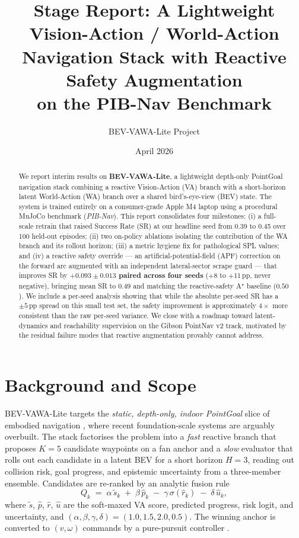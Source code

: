 \documentclass[11pt,a4paper]{article}
\title{\textbf{Stage Report: A Lightweight Vision-Action / World-Action\\
Navigation Stack with Reactive Safety Augmentation\\
on the PIB-Nav Benchmark}}
\author{BEV-VAWA-Lite Project}
\date{April 2026}
\begin{document}
\maketitle

\begin{abstract}
We report interim results on \textbf{BEV-VAWA-Lite}, a lightweight
depth-only PointGoal navigation stack combining a reactive Vision-Action
(VA) branch with a short-horizon latent World-Action (WA) branch over a
shared bird's-eye-view (BEV) state. The system is trained entirely on a
consumer-grade Apple M4 laptop using a procedural MuJoCo benchmark
(\emph{PIB-Nav}). This report consolidates four milestones: (i) a
full-scale retrain that raised Success Rate (SR) at our headline seed
from 0.39 to 0.45 over 100 held-out episodes; (ii) two on-policy
ablations isolating the contribution of the WA branch and its rollout
horizon; (iii) a metric hygiene fix for pathological SPL values; and
(iv) a reactive safety override --- an artificial-potential-field (APF)
correction on the forward arc augmented with an independent
lateral-sector scrape guard --- that improves SR by
\textbf{$+0.093 \pm 0.013$ paired across four seeds}
($+8$ to $+11$\,pp, never negative), bringing mean SR to $0.49$ and
matching the reactive-safety A$^\star$ baseline ($0.50$). We include a
per-seed analysis showing that while the absolute per-seed SR has
a $\pm 5$\,pp spread on this small test set, the safety improvement is
approximately $4\times$ more consistent than the raw per-seed variance.
We close with a roadmap toward latent-dynamics and reachability
supervision on the Gibson PointNav v2 track, motivated by the residual
failure modes that reactive augmentation provably cannot address.
\end{abstract}

\section{Background and Scope}\label{sec:bg}

BEV-VAWA-Lite targets the \emph{static, depth-only, indoor PointGoal}
slice of embodied navigation \citep{AndersonOnEvaluation2018}, where
recent foundation-scale systems
\citep{OmniVLA,NaVILA,InternNav} are arguably overbuilt. The stack
factorises the problem into a \emph{fast} reactive branch that proposes
$K{=}5$ candidate waypoints on a fan anchor and a \emph{slow} evaluator
that rolls out each candidate in a latent BEV for a short horizon
$H{=}3$, reading out collision risk, goal progress, and epistemic
uncertainty from a three-member ensemble. Candidates are re-ranked by
an analytic fusion rule
\begin{equation}
Q_k \;=\; \alpha\,\tilde{s}_k \;+\; \beta\,\hat{p}_k
        \;-\; \gamma\,\sigma(\hat{r}_k) \;-\; \delta\,\hat{u}_k,
\label{eq:fusion}
\end{equation}
where $\tilde{s}$, $\hat{p}$, $\hat{r}$, $\hat{u}$ are the
soft-maxed VA score, predicted progress, risk logit, and uncertainty,
and $(\alpha,\beta,\gamma,\delta)=(1.0,1.5,2.0,0.5)$. The winning
anchor is converted to $(v,\omega)$ commands by a pure-pursuit
controller \citep{Coulter1992}.
\end{document}
